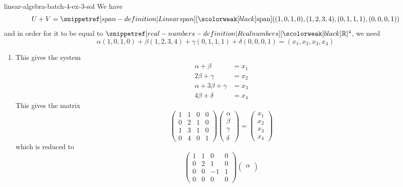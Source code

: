 \documentclass[preview]{standalone}
\begin{document}
\begin{snippetsolution}{linear-algebra-batch-4-ex-3-sol}{}
    We have
    \[
        U+V = \linearspan((1,0,1,0), (1,2,3,4), (0,1,1,1), (0,0,0,1))
    \]
    and in order for it to be equal to \(\realnumbers^4\), we need
    \[
        \alpha (1,0,1,0) + \beta (1,2,3,4) + \gamma (0,1,1,1) + \delta (0,0,0,1) = (x_1,x_2,x_3,x_4)
    \]
    \begin{enumerate}
        \item This gives the system
        \begin{align*}
            \alpha + \beta &= x_1 \\
            2\beta + \gamma &= x_2 \\
            \alpha + 3\beta + \gamma &= x_3 \\
            4\beta + \delta &= x_4
        \end{align*}
        This gives the matrix
        \[
            \begin{pmatrix}
                1 & 1 & 0 & 0 \\
                0 & 2 & 1 & 0 \\
                1 & 3 & 1 & 0 \\
                0 & 4 & 0 & 1
            \end{pmatrix}
            \begin{pmatrix}
                \alpha \\
                \beta \\
                \gamma \\
                \delta
            \end{pmatrix}
            =
            \begin{pmatrix}
                x_1 \\
                x_2 \\
                x_3 \\
                x_4
            \end{pmatrix}
        \]
        which is reduced to
        \[
            \begin{pmatrix}
                1 & 1 & 0 & 0 \\
                0 & 2 & 1 & 0 \\
                0 & 0 & -1 & 1 \\
                0 & 0 & 0 & 0
            \end{pmatrix}
            \begin{pmatrix}
                \alpha \\

\end{pmatrix}\]
\end{enumerate}
\end{snippetsolution}
\end{document}
